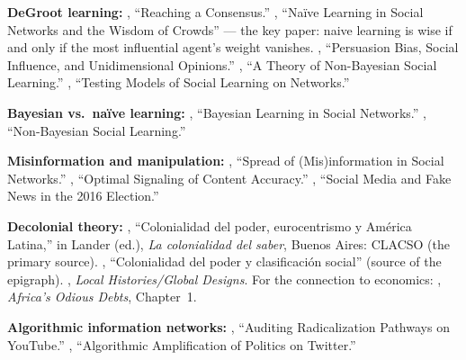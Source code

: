 \documentclass[../structural_economics_book.tex]{subfiles}
\begin{document}
\textbf{DeGroot learning:} \citet{degroot1974reaching}, ``Reaching a Consensus.'' \citet{golub2010naive}, ``Na\"{i}ve Learning in Social Networks and the Wisdom of Crowds'' --- the key paper: naive learning is wise if and only if the most influential agent's weight vanishes. \citet{demarzo2003persuasion}, ``Persuasion Bias, Social Influence, and Unidimensional Opinions.'' \citet{molavi2018theory}, ``A Theory of Non-Bayesian Social Learning.'' \citet{chandrasekhar2020testing}, ``Testing Models of Social Learning on Networks.''

\textbf{Bayesian vs.\ na\"{i}ve learning:} \citet{acemoglu2011bayesian}, ``Bayesian Learning in Social Networks.'' \citet{jadbabaie2012nonbayesian}, ``Non-Bayesian Social Learning.''

\textbf{Misinformation and manipulation:} \citet{acemoglu2010spread}, ``Spread of (Mis)information in Social Networks.'' \citet{candogan2020optimal}, ``Optimal Signaling of Content Accuracy.'' \citet{allcott2017social}, ``Social Media and Fake News in the 2016 Election.''

\textbf{Decolonial theory:} \citet{quijano2000colonialidad}, ``Colonialidad del poder, eurocentrismo y Am\'{e}rica Latina,'' in Lander (ed.), \textit{La colonialidad del saber}, Buenos Aires: CLACSO (the primary source). \citet{quijano2000colonialidadclasificacion}, ``Colonialidad del poder y clasificaci\'{o}n social'' (source of the epigraph). \citet{mignolo2000local}, \textit{Local Histories/Global Designs}. For the connection to economics: \citet{ndikumana2011africa}, \textit{Africa's Odious Debts}, Chapter~1.

\textbf{Algorithmic information networks:} \citet{ribeiro2020auditing}, ``Auditing Radicalization Pathways on YouTube.'' \citet{huszar2022algorithmic}, ``Algorithmic Amplification of Politics on Twitter.''
\end{document}
